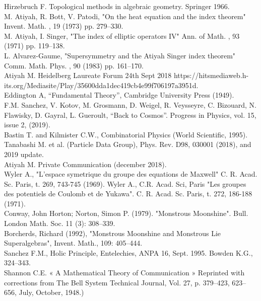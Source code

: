 \documentclass[a4paper,9pt]{article}
\begin{document}
\begin{thebibliography}{99}
 Hirzebruch F. Topological methods in algebraic geometry. Springer 1966.\\
 M. Atiyah, R. Bott, V. Patodi, "On the heat equation and the index theorem" Invent. Math. , 19 (1973) pp. 279--330.\\
 M. Atiyah, I. Singer, "The index of elliptic operators IV" Ann. of Math. , 93 (1971) pp. 119--138. \\
 L. Alvarez-Gaume, "Supersymmetry and the Atiyah Singer index theorem" Comm. Math. Phys. , 90 (1983) pp. 161--170.\\
 Atiyah M. Heidelberg Laureate Forum 24th Sept 2018 https://hitsmediaweb.h-its.org/Mediasite/Play/35600dda1dec419cb4e99f706197a3951d. \\ 
 Eddington A, ``Fundamental Theory'', Cambridge University Press (1949).\\
 F.M. Sanchez, V. Kotov, M. Grosmann, D. Weigel, R. Veysseyre, C. Bizouard, N. Flawisky, D. Gayral, L. Gueroult, ``Back to Cosmos''. Progress in Physics, vol. 15, issue 2, (2019).\\ 
 Bastin T. and Kilmister C.W., Combinatorial Physics (World Scientific, 1995).\\
 Tanabashi M. et al. (Particle Data Group), Phys. Rev. D98, 030001 (2018), and 2019 update.\\
 Atiyah M. Private Communication (december 2018).\\
 Wyler A., "L'espace symetrique du groupe des equations de Maxwell" C. R. Acad. Sc. Paris, t. 269, 743-745 (1969). Wyler A., C.R. Acad. Sci, Paris "Les groupes des potentiels de Coulomb et de Yukawa". C. R. Acad. Sc. Paris, t. 272, 186-188 (1971).\\
 Conway, John Horton; Norton, Simon P. (1979). "Monstrous Moonshine". Bull. London Math. Soc. 11 (3): 308--339.\\
 Borcherds, Richard (1992), "Monstrous Moonshine and Monstrous Lie Superalgebras", Invent. Math., 109: 405--444.\\
  Sanchez F.M., Holic Principle, Entelechies, ANPA 16, Sept. 1995. Bowden K.G., 324--343.\\
 Shannon C.E. « A Mathematical Theory of Communication » Reprinted with corrections from The Bell System Technical Journal, Vol. 27, p. 379–423, 623–656, July, October, 1948.)\\

\end{thebibliography}
\end{document}

